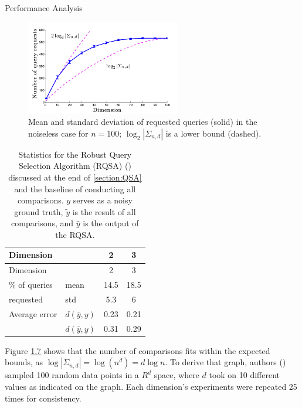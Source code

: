 \documentclass[
  letterpaper,
  DIV=11,
  numbers=noendperiod,
  oneside]{scrreprt}
\makeatletter
\let\oldparagraph\paragraph
\renewcommand{\paragraph}{
    \@ifstar
      \xxxParagraphStar
      \xxxParagraphNoStar
  }
\newcommand{\xxxParagraphStar}[1]{\oldparagraph*{#1}\mbox{}}
\newcommand{\xxxParagraphNoStar}[1]{\oldparagraph{#1}\mbox{}}
\theoremstyle{remark}
\makeatother
\begin{document}
\paragraph{Performance Analysis}\label{performance-analysis}

\begin{figure}

{\centering \includegraphics[width=0.6\textwidth,height=\textheight]{Figures/Dim:query_graph.png}

}

\caption{Mean and standard deviation of requested queries (solid) in the
noiseless case for \(n = 100\); \(\log_2|\Sigma_{n,d}|\) is a lower
bound (dashed).}

\end{figure}%

\label{fig:geo_acc}
\begin{longtable}[]{@{}llcc@{}}
\caption{Statistics for the Robust Query Selection Algorithm (RQSA)
() discussed at the end of
\hyperref[section:QSA]{{[}section:QSA{]}} and the baseline of conducting
all comparisons. \(y\) serves as a noisy ground truth, \(\tilde{y}\) is
the result of all comparisons, and \(\hat{y}\) is the output of the
RQSA.}\tabularnewline
\toprule\noalign{}
Dimension & & 2 & 3 \\
\midrule\noalign{}
\endfirsthead
\toprule\noalign{}
Dimension & & 2 & 3 \\
\midrule\noalign{}
\endhead
\bottomrule\noalign{}
\endlastfoot
\% of queries & mean & 14.5 & 18.5 \\
requested & std & 5.3 & 6 \\
Average error & \(d(\bar{y}, y)\) & 0.23 & 0.21 \\
& \(d(\bar{y}, y)\) & 0.31 & 0.29 \\
\end{longtable}

Figure \hyperref[fig:rand_n]{1.7} shows that the number of comparisons
fits within the expected bounds, as
\(\log|\Sigma_{n,d}| = \log(n^d) = d\log n\). To derive that graph,
authors () sampled 100 random
data points in a \(R^d\) space, where \(d\) took on 10 different values
as indicated on the graph. Each dimension's experiments were repeated 25
times for consistency.
\end{document}
